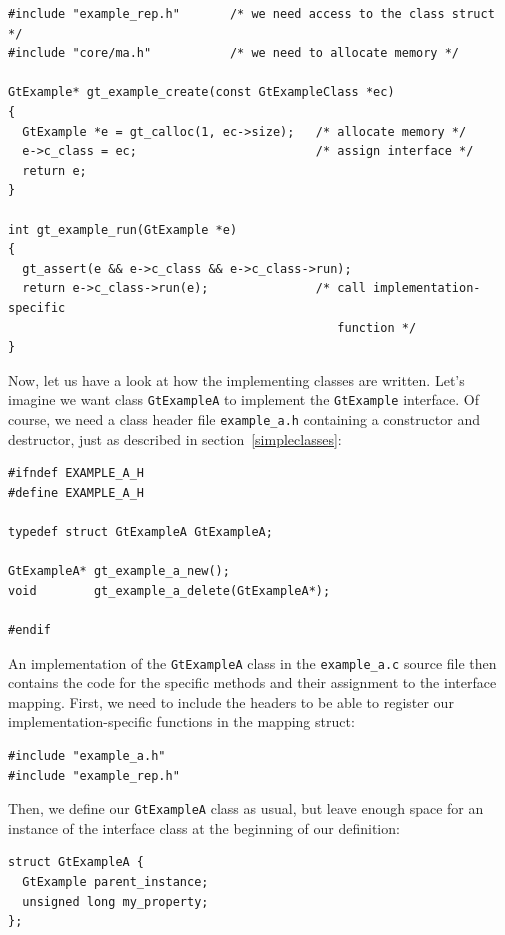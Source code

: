 \documentclass[11pt,final]{article}
\newcommand{\keyword}[1]{\lstinline{#1}}
\begin{document}
\begin{lstlisting}
#include "example_rep.h"       /* we need access to the class struct */
#include "core/ma.h"           /* we need to allocate memory */

GtExample* gt_example_create(const GtExampleClass *ec)
{
  GtExample *e = gt_calloc(1, ec->size);   /* allocate memory */
  e->c_class = ec;                         /* assign interface */
  return e;
}

int gt_example_run(GtExample *e)
{
  gt_assert(e && e->c_class && e->c_class->run);
  return e->c_class->run(e);               /* call implementation-specific
                                              function */
}
\end{lstlisting}

Now, let us have a look at how the implementing classes are written. Let's
imagine we want class \keyword{GtExampleA} to implement the \keyword{GtExample}
interface. Of course, we need a class header file \keyword{example_a.h}
containing a constructor and destructor, just as described in
section~\ref{simpleclasses}:

\begin{lstlisting}
#ifndef EXAMPLE_A_H
#define EXAMPLE_A_H

typedef struct GtExampleA GtExampleA;

GtExampleA* gt_example_a_new();
void        gt_example_a_delete(GtExampleA*);

#endif
\end{lstlisting}

An implementation of the \keyword{GtExampleA} class in the \keyword{example_a.c}
source file then contains the code for the specific methods and their assignment
to the interface mapping. First, we need to include the headers to be able to
register our implementation-specific functions in the mapping struct:

\begin{lstlisting}
#include "example_a.h"
#include "example_rep.h"
\end{lstlisting}

Then, we define our \keyword{GtExampleA} class as usual, but leave enough space
for an instance of the interface class at the beginning of our definition:

\begin{lstlisting}
struct GtExampleA {
  GtExample parent_instance;
  unsigned long my_property;
};
\end{lstlisting}
\end{document}
